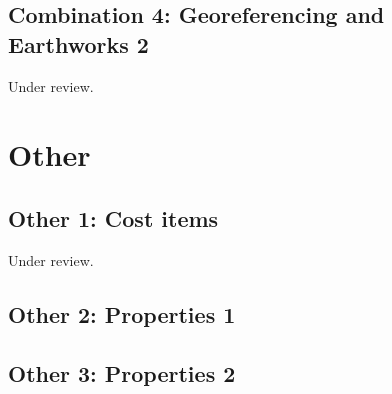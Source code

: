 \documentclass{scrartcl}
\begin{document}
\subsection{Combination 4: Georeferencing and Earthworks 2} %
\label{sec:georef_earth_2}
Under review.%
\clearpage

\section{Other}
\label{sec:other}

\subsection{Other 1: Cost items} %
\label{sec:other_1}
Under review.%
\clearpage

\subsection{Other 2: Properties 1} %
\label{sec:other_2}
\clearpage

\subsection{Other 3: Properties 2} %
\label{sec:other_3}
\clearpage
\end{document}
